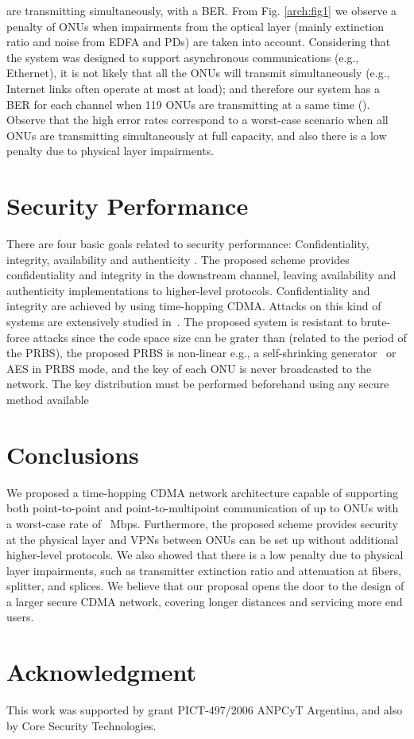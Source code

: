 \documentclass[10pt]{article}
\begin{document}
are transmitting simultaneously, with a BER. 
From Fig. \ref{arch:fig1} we observe a penalty of  ONUs when
impairments from the optical layer (mainly extinction ratio and noise from EDFA and PDs) are taken into account.
Considering that the system was designed to support asynchronous communications (e.g., Ethernet), it is not likely that all the ONUs will transmit simultaneously (e.g., Internet links often operate at most at  load); and therefore our system has a BER  for each channel when 119 ONUs are transmitting at a same time ().
Observe that the high error rates correspond to a
worst-case scenario when all ONUs are transmitting simultaneously at
full capacity, and also 
there is a low penalty due to physical layer impairments.

\section{Security Performance}
There are four basic goals related to security performance: Confidentiality, integrity, availability and authenticity \cite{Dhillon:07}.
The proposed scheme provides confidentiality and integrity in the downstream channel, leaving availability and authenticity implementations to higher-level protocols. Confidentiality and integrity are achieved by using time-hopping CDMA.
Attacks on this kind of systems are extensively studied in~\cite{Shake:05}. The proposed system is resistant to brute-force attacks since the code space size can be grater than  (related to the period of the PRBS), the proposed PRBS is non-linear e.g., a self-shrinking generator~\cite{Meier:94} or AES in PRBS mode, and the key of each ONU is never broadcasted to the network. The key distribution must be performed beforehand using any secure method available~\cite{Denning:82}


\section{Conclusions}
We proposed a time-hopping CDMA network architecture capable of
supporting both point-to-point and point-to-multipoint communication of
up to  ONUs with a worst-case rate of ~Mbps. Furthermore, the
proposed scheme provides security at the physical layer and VPNs between
ONUs can be set up without additional higher-level protocols.  We also
showed that there is a low penalty due to physical
layer
impairments, such as transmitter extinction ratio and attenuation at
fibers, splitter, and splices.
We believe that our proposal opens the door to the design of a larger
secure
CDMA network, covering longer distances and servicing more end users.


\section*{Acknowledgment}
This work was supported by grant PICT-497/2006 ANPCyT Argentina, and also by Core Security Technologies.



\end{document}

